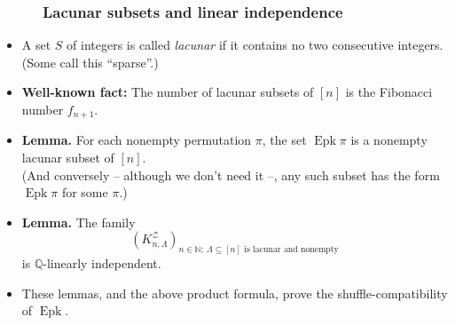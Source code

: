 \documentclass{beamer}
\newcommand{\Epk}{\operatorname{Epk}}
\newcommand{\fti}[1]{\frametitle{\ \ \ \ \ #1}}
\newcommand{\ive}[1]{\left[ #1 \right]}
\newcommand{\defn}[1]{{\color{darkred}\emph{#1}}} %
\theoremstyle{plain}
\begin{document}
\begin{frame}
\fti{Lacunar subsets and linear independence}

\begin{itemize}

\item A set $S$ of integers is called \defn{lacunar} if it contains
      no two consecutive integers. (Some call this ``sparse''.)

\item \textbf{Well-known fact:} The number of lacunar subsets of
      $\ive{n}$ is the Fibonacci number $f_{n+1}$.

\pause

\item \textbf{Lemma.}
      For each nonempty permutation $\pi$, the set $\Epk \pi$ is a nonempty
      lacunar subset of $\ive{n}$. \\
      (And conversely -- although we don't need it --,
      any such subset has the form $\Epk \pi$ for some $\pi$.)

\pause

\item \textbf{Lemma.}
      The family
        \[
        \left(  K_{n,\Lambda}^{\mathcal{Z}}\right)  _{n\in\mathbb{N};\ \Lambda
        \subseteq\left[  n\right]  \text{ is lacunar and nonempty}}%
        \]
        is $\mathbb{Q}$-linearly independent.

\item These lemmas, and the above product formula, prove the
      shuffle-compatibility of $\Epk$.

\end{itemize}

\end{frame}
\end{document}
